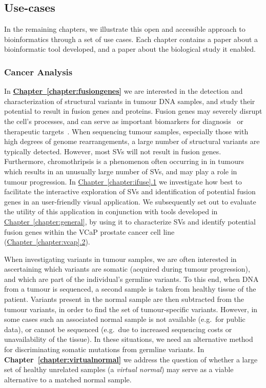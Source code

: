 \begin{justify}
\subsection*{Use-cases}
In the remaining chapters, we illustrate this open and accessible approach to bioinformatics through a set of use cases.
Each chapter contains a paper about a bioinformatic tool developed, and a paper about the biological study it enabled.

\subsubsection*{Cancer Analysis}
In \hyperref[chapter:fusiongenes]{\textbf{Chapter~\ref{chapter:fusiongenes}}} we are interested in the detection and characterization of structural variants in tumour DNA samples, and study their potential to result in fusion genes and proteins.
Fusion genes may severely disrupt the cell's processes, and can serve as important biomarkers for diagnosis~\cite{song2020overview,koo2019merging} or therapeutic targets~\cite{druker2001activity,druker2001efficacy}.
When sequencing tumour samples, especially those with high degrees of genome rearrangements, a large number of structural variants are typically detected. However, most SVs will not result in fusion genes.
Furthermore, chromothripsis is a phenomenon often occurring in in tumours which results in an unusually large number of SVs, and may play a role in tumour progression.
In \hyperref[chapter:ifuse]{Chapter~\ref{chapter:ifuse}.1} we investigate how best to facilitate the interactive exploration of SVs and identification of potential fusion genes in an user-friendly visual application.
We subsequently set out to evaluate the utility of this application in conjunction with tools developed in \hyperref[chapter:general]{Chapter~\ref{chapter:general}}, by using it to characterize SVs and identify potential fusion genes within the VCaP prostate cancer cell line (\hyperref[chapter:vcap]{Chapter~\ref{chapter:vcap}.2}).

When investigating variants in tumour samples, we are often interested in ascertaining which variants are somatic (acquired during tumour progression), and which are part of the individual's germline variants.
To this end, when DNA from a tumour is sequenced, a second sample is taken from healthy tissue of the patient.
Variants present in the normal sample are then subtracted from the tumour variants, in order to find the set of tumour-specific variants.
However, in some cases such an associated normal sample is not available (e.g.\ for public data), or cannot be sequenced (e.g.\ due to increased sequencing costs or unavailability of the tissue).
In these situations, we need an alternative method for discriminating somatic mutations from germline variants.
In \textbf{Chapter~\ref{chapter:virtualnormal}} we address the question of whether a large set of healthy unrelated samples (a \emph{virtual normal}) may serve as a viable alternative to a matched normal sample.


\end{justify}
